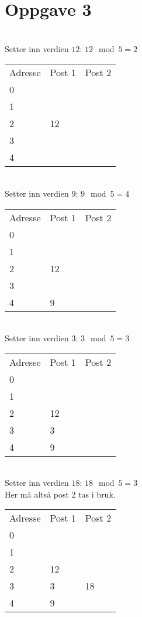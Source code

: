 \section{Oppgave 3}
~\\
Setter inn verdien $12$: $12 \mod 5 = 2$\\
\begin{tabular}{|l|l|l|}
    \hline
    Adresse & Post 1 & Post 2 \\
    0       & ~      & ~      \\
    1       & ~      & ~      \\
    2       & 12     & ~      \\
    3       & ~      & ~      \\
    4       & ~      & ~      \\ \hline
\end{tabular}

~\\
Setter inn verdien $9$: $9 \mod 5 = 4$\\
\begin{tabular}{|l|l|l|}
    \hline
    Adresse & Post 1 & Post 2 \\
    0       & ~      & ~      \\
    1       & ~      & ~      \\
    2       & 12     & ~      \\
    3       & ~      & ~      \\
    4       & 9      & ~      \\ \hline
\end{tabular}

~\\
Setter inn verdien $3$: $3 \mod 5 = 3$\\
\begin{tabular}{|l|l|l|}
    \hline
    Adresse & Post 1 & Post 2 \\
    0       & ~      & ~      \\
    1       & ~      & ~      \\
    2       & 12     & ~      \\
    3       & 3      & ~      \\
    4       & 9      & ~      \\ \hline
\end{tabular}

~\\
Setter inn verdien $18$: $18 \mod 5 = 3$\\
Her må altså post 2 tas i bruk.\\
\begin{tabular}{|l|l|l|}
    \hline
    Adresse & Post 1 & Post 2 \\
    0       & ~      & ~      \\
    1       & ~      & ~      \\
    2       & 12     & ~      \\
    3       & 3      & 18      \\
    4       & 9      & ~      \\ \hline
\end{tabular}

